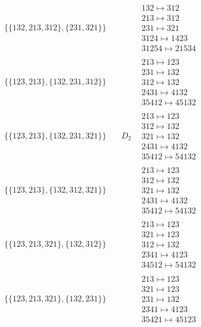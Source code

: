 \begin{tiny}
\begin{align}
\begin{matrix}
\end{matrix}
\\
\{\{132, 213, 312\}, \{231, 321\}\}
\quad
&
\phantom{.}
&
\begin{matrix}
132 \mapsto 312\\213 \mapsto 312\\231 \mapsto 321\\3124 \mapsto 1423\\31254 \mapsto 21534
\end{matrix}
\\
\{\{123, 213\}, \{132, 231, 312\}\}
\quad
&
\phantom{.}
&
\begin{matrix}
213 \mapsto 123\\231 \mapsto 132\\312 \mapsto 132\\2431 \mapsto 4132\\35412 \mapsto 45132
\end{matrix}
\\
\{\{123, 213\}, \{132, 231, 321\}\}
\quad
&
D_2
&
\begin{matrix}
213 \mapsto 123\\312 \mapsto 132\\321 \mapsto 132\\2431 \mapsto 4132\\35412 \mapsto 54132
\end{matrix}
\\
\{\{123, 213\}, \{132, 312, 321\}\}
\quad
&
\phantom{.}
&
\begin{matrix}
213 \mapsto 123\\312 \mapsto 132\\321 \mapsto 132\\2431 \mapsto 4132\\35412 \mapsto 54132
\end{matrix}
\\
\{\{123, 213, 321\}, \{132, 312\}\}
\quad
&
\phantom{.}
&
\begin{matrix}
213 \mapsto 123\\321 \mapsto 123\\312 \mapsto 132\\2341 \mapsto 4123\\34512 \mapsto 54132
\end{matrix}
\\
\{\{123, 213, 321\}, \{132, 231\}\}
\quad
&
\phantom{.}
&
\begin{matrix}
213 \mapsto 123\\321 \mapsto 123\\231 \mapsto 132\\2341 \mapsto 4123\\35421 \mapsto 45123

\end{matrix}
\end{align}
\end{tiny}
